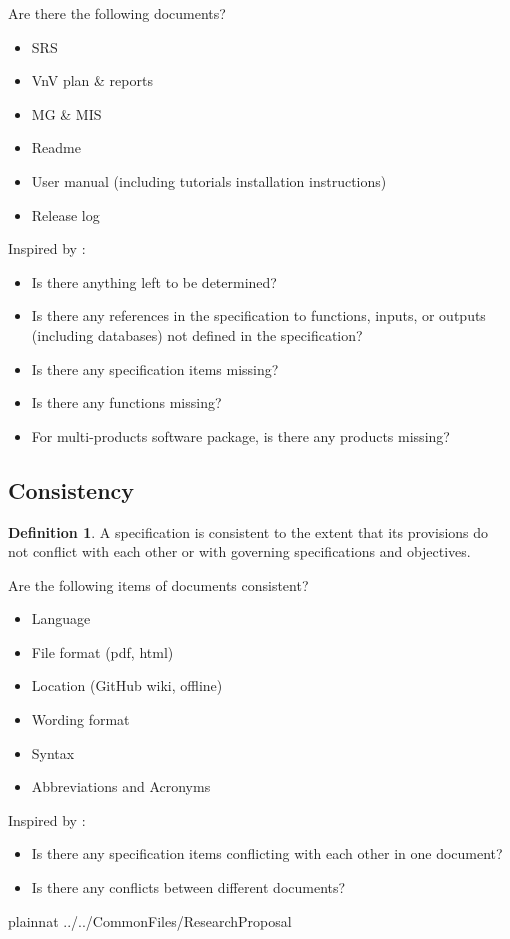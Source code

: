 \documentclass{article}
\theoremstyle{definition}
\newtheorem{defn}{Definition}
\begin{document}
Are there the following documents?
\begin{itemize}
\item SRS
\item VnV plan \& reports
\item MG \& MIS
\item Readme
\item User manual (including tutorials installation instructions) 
\item Release log
\end{itemize}
Inspired by \citep{Boehm1984}:
\begin{itemize}
\item Is there anything left to be determined?
\item Is there any references in the specification to functions, inputs, or
outputs (including databases) not defined in the specification?
\item Is there any specification items missing?
\item Is there any functions missing?
\item For multi-products software package, is there any products missing?
\end{itemize}

\subsection{Consistency}
\begin{defn}
A specification is consistent to the extent that its provisions do not conflict
with each other or with governing specifications and objectives.
\end{defn}

Are the following items of documents consistent?
\begin{itemize}
\item Language
\item File format (pdf, html)
\item Location (GitHub wiki, offline)
\item Wording format
\item Syntax
\item Abbreviations and Acronyms
\end{itemize}

Inspired by \citep{Boehm1984}:
\begin{itemize}
\item Is there any specification items conflicting with each other in one
document?
\item Is there any conflicts between different documents?
\end{itemize}

\newpage

 {plainnat}
 {../../CommonFiles/ResearchProposal}
\end{document}
